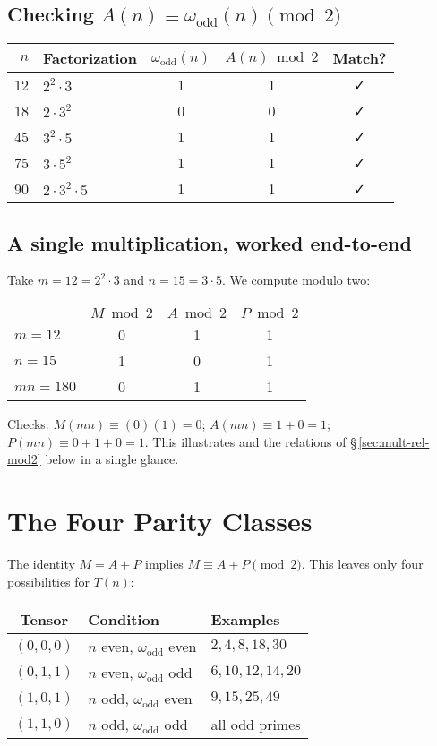 \documentclass[11pt,a4paper]{article}
\numberwithin{equation}{section}
\numberwithin{figure}{section}
\numberwithin{table}{section}
\theoremstyle{plain}
\theoremstyle{definition}
\theoremstyle{remark}
\begin{document}
\subsection*{Checking \(A(n)\equiv \omega_{\mathrm{odd}}(n)\pmod 2\)}
\begin{center}
\begin{tabular}{r l c c c}
\toprule
\(n\) & Factorization & \(\omega_{\mathrm{odd}}(n)\) & \(A(n)\bmod 2\) & Match? \\
\midrule
12 & \(2^2\cdot 3\)       & 1 & 1 & ✓ \\
18 & \(2\cdot 3^2\)       & 0 & 0 & ✓ \\
45 & \(3^2\cdot 5\)       & 1 & 1 & ✓ \\
75 & \(3\cdot 5^2\)       & 1 & 1 & ✓ \\
90 & \(2\cdot 3^2\cdot 5\) & 1 & 1 & ✓ \\
\bottomrule
\end{tabular}
\end{center}

\subsection*{A single multiplication, worked end-to-end}
Take \(m=12=2^2\cdot 3\) and \(n=15=3\cdot 5\). We compute modulo two:
\begin{center}
\begin{tabular}{l c c c}
\toprule
 & \(M\bmod 2\) & \(A\bmod 2\) & \(P\bmod 2\) \\
\midrule
\(m=12\) & 0 & 1 & 1 \\
\(n=15\) & 1 & 0 & 1 \\
\(mn=180\) & 0 & 1 & 1 \\
\bottomrule
\end{tabular}
\end{center}
Checks: \(M(mn)\equiv (0)(1)=0\); \(A(mn)\equiv 1+0=1\); \(P(mn)\equiv 0+1+0=1\). This illustrates  and the relations of \S\,\ref{sec:mult-rel-mod2} below in a single glance.

\section{The Four Parity Classes}
The identity \(M=A+P\) implies \(M\equiv A+P\pmod 2\). This leaves only four possibilities for \(T(n)\):
\begin{center}
\begin{tabular}{c l l}
\toprule
Tensor & Condition & Examples \\
\midrule
\((0,0,0)\) & \(n\) even, \(\omega_{\mathrm{odd}}\) even & \(2, 4, 8, 18, 30\) \\
\((0,1,1)\) & \(n\) even, \(\omega_{\mathrm{odd}}\) odd  & \(6, 10, 12, 14, 20\) \\
\((1,0,1)\) & \(n\) odd, \(\omega_{\mathrm{odd}}\) even  & \(9, 15, 25, 49\) \\
\((1,1,0)\) & \(n\) odd, \(\omega_{\mathrm{odd}}\) odd   & all odd primes \\
\bottomrule
\end{tabular}
\end{center}
\end{document}
